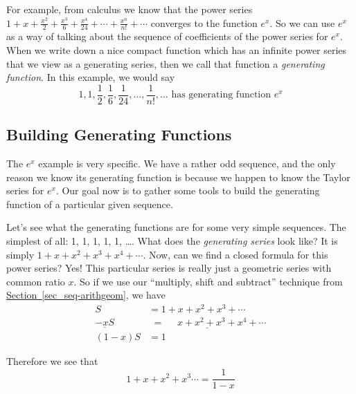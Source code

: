 \documentclass[10pt,]{book}
\theoremstyle{plain}
\theoremstyle{definition}
\theoremstyle{definition}
\theoremstyle{definition}
\numberwithin{equation}{chapter}
\newcommand{\amp}{ & }
\begin{document}
For example, from calculus we know that the power series \(1 + x + \frac{x^2}{2} + \frac{x^3}{6} + \frac{x^4}{24} + \cdots + \frac{x^n}{n!} + \cdots\) converges to the function \(e^x\). So we can use \(e^x\) as a way of talking about the sequence of coefficients of the power series for \(e^x\). When we write down a nice compact function which has an infinite power series that we view as a generating series, then we call that function a \emph{generating function}. In this example, we would say
\begin{equation*}
  1, 1, \frac{1}{2}, \frac{1}{6}, \frac{1}{24}, \ldots, \frac{1}{n!}, \ldots \mbox{ has generating function }  e^x
\end{equation*}
%
\typeout{************************************************}
\typeout{************************************************}
\subsection[Building Generating Functions]{Building Generating Functions}\label{subsection-42}

The \(e^x\) example is very specific. We have a rather odd sequence, and the only reason we know its generating function is because we happen to know the Taylor series for \(e^x\). Our goal now is to gather some tools to build the generating function of a particular given sequence.
%
\par

Let's see what the generating functions are for some very simple sequences. The simplest of all: 1, 1, 1, 1, 1, \dots{}. What does the \emph{generating series} look like? It is simply \(1 + x + x^2 + x^3 + x^4 + \cdots\). Now, can we find a closed formula for this power series? Yes! This particular series is really just a geometric series with common ratio \(x\). So if we use our ``multiply, shift and subtract'' technique from \hyperref[sec_seq-arithgeom]{Section~\ref{sec_seq-arithgeom}}, we have
\begin{align*}
  S \amp  = 1 + x + x^2 + x^3 + \cdots\\
  \underline{- xS} \amp  \underline{\,\, = ~~~~~~ x + x^2 + x^3 + x^4 + \cdots}\\
  (1-x)S \amp  = 1
\end{align*}
%
\par

Therefore we see that
\begin{equation*}
  1 + x + x^2 + x^3 \cdots = \dfrac{1}{1-x}
\end{equation*}
%
\par
\end{document}
